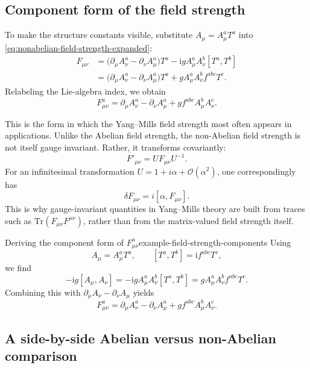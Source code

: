 \documentclass[11pt,a4paper]{article}
\newcommand{\ii}{\mathrm{i}}
\newcommand{\p}{\partial}
\newcommand{\comm}[2]{\left[#1,#2\right]}
\begin{document}
\subsection{Component form of the field strength}

To make the structure constants visible, substitute \(A_\mu=A_\mu^aT^a\) into \eqref{eq:nonabelian-field-strength-expanded}:
\begin{align}
F_{\mu\nu}
&=
\bigl(\p_\mu A_\nu^a-\p_\nu A_\mu^a\bigr)T^a
-\ii g A_\mu^aA_\nu^b\comm{T^a}{T^b}
\nonumber\\
&=
\bigl(\p_\mu A_\nu^a-\p_\nu A_\mu^a\bigr)T^a
+gA_\mu^aA_\nu^b f^{abc}T^c.
\end{align}
Relabeling the Lie-algebra index, we obtain
\begin{equation}
F_{\mu\nu}^a = \p_\mu A_\nu^a-\p_\nu A_\mu^a+g f^{abc}A_\mu^bA_\nu^c.
\label{eq:field-strength-components-expanded}
\end{equation}

This is the form in which the Yang--Mills field strength most often appears in applications.  
Unlike the Abelian field strength, the non-Abelian field strength is not itself gauge invariant. Rather, it transforms covariantly:
\begin{equation}
	F'_{\mu\nu} = U F_{\mu\nu} U^{-1}.
\end{equation}
For an infinitesimal transformation \(U = 1 + i\alpha + \mathcal{O}(\alpha^2)\), one correspondingly has
\begin{equation}
	\delta F_{\mu\nu} = i[\alpha, F_{\mu\nu}] .
\end{equation}
This is why gauge-invariant quantities in Yang--Mills theory are built from traces such as \(\mathrm{Tr}(F_{\mu\nu}F^{\mu\nu})\), rather than from the matrix-valued field strength itself.



\begin{examplebox}{Deriving the component form of \texorpdfstring{$F_{\mu\nu}^a$}{Fmunua}}{example-field-strength-components}
Using
\[
A_\mu=A_\mu^aT^a,
\qquad
\comm{T^a}{T^b}=\ii f^{abc}T^c,
\]
we find
\[
-\ii g\comm{A_\mu}{A_\nu} = -\ii gA_\mu^aA_\nu^b\comm{T^a}{T^b}
= gA_\mu^aA_\nu^b f^{abc}T^c.
\]
Combining this with \(\p_\mu A_\nu-\p_\nu A_\mu\) yields
\[
F_{\mu\nu}^a=\p_\mu A_\nu^a-\p_\nu A_\mu^a+g f^{abc}A_\mu^bA_\nu^c.
\]
\end{examplebox}



\subsection{A side-by-side Abelian versus non-Abelian comparison}
\end{document}
